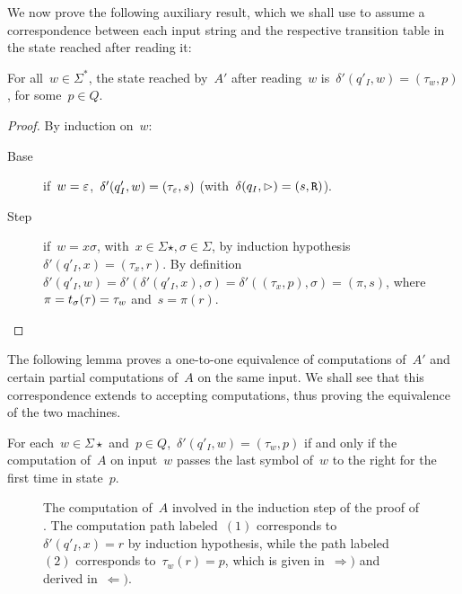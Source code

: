 We now prove the following auxiliary result, which we shall use to assume a correspondence between each input string and the respective transition table in the state reached after reading it:
\begin{lemm}
	For all~$w \in \Sigma^*$, the state reached by~$A'$ after reading~$w$ is~$\delta'(q'_I,w) = (\tau_w,p)$, for some~$p\in Q$.
\end{lemm}
\begin{proof}
	By induction on~$w$:
	\begin{description}
		\item[Base] if~$w=\varepsilon$,~$\delta'(q'_I,w)=(\tau_\varepsilon,s)$ (with~$\delta(q_I,\rhd)=(s,\mathtt R)$).
		\item[Step] if~$w=x\sigma$, with~$x\in\Sigma\star,\sigma\in\Sigma$, by induction hypothesis~$\delta'(q'_I,x)=(\tau_x,r)$.
		      By definition~$\delta'(q'_I,w)=\delta'(\delta'(q'_I,x),\sigma)=\delta'((\tau_x,p),\sigma)=(\pi,s)$, where~$\pi=t_\sigma(\tau)=\tau_w$ and~$s=\pi(r)$. \qedhere
	\end{description}
\end{proof}

The following lemma proves a one-to-one equivalence of computations of~$A'$ and certain partial computations of~$A$ on the same input. We shall see that this correspondence extends to accepting computations, thus proving the equivalence of the two machines.
\begin{lemm}\label{lem:transtab2DFA}
	For each~$w\in\Sigma\star$ and~$p\in Q$,~$\delta'(q'_I,w)=(\tau_w,p)$ if and only if the computation of~$A$ on input~$w$ passes the last symbol of~$w$ to the right for the first time in state~$p$.
\end{lemm}


\begin{figure}
	\centering
	
	\caption[Induction step of the proof of ]{The computation of~$A$ involved in the induction step of the proof of .
		The computation path labeled~$(1)$ corresponds to~$\delta'(q'_I,x)=r$ by induction hypothesis, while the path labeled~$(2)$ corresponds to~$\tau_w(r)=p$, which is given in~$\Rightarrow)$ and derived in~$\Leftarrow)$.}
	\label{fig:transtabproof}
\end{figure}

